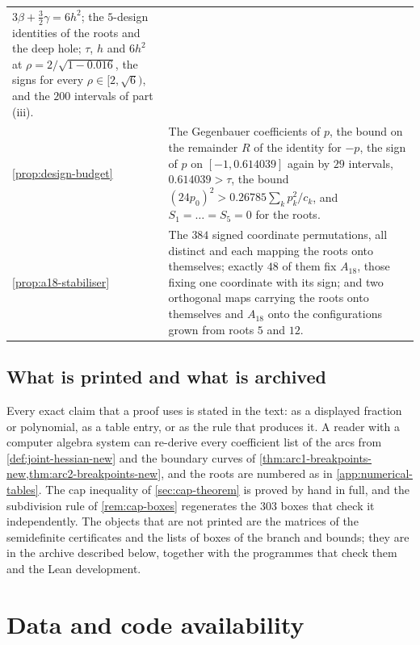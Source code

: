 \documentclass[11pt,reqno]{amsart}
\renewcommand{\_}{\origunderscore\allowbreak}
\numberwithin{equation}{section}
\theoremstyle{plain}
\theoremstyle{definition}
\theoremstyle{remark}
\begin{document}
\begin{longtable}{@{}p{}p{}@{}}
$3\beta+\frac32\gamma=6h^2$; the $5$-design identities of the roots and the
deep hole; $\tau$, $h$ and $6h^2$ at $\rho=2/\sqrt{1-0.016}$, the signs for
every $\rho\in[2,\sqrt6)$, and the $200$ intervals of part (iii). \\
\cref{prop:design-budget} & The Gegenbauer coefficients of $p$, the bound
on the remainder $R$ of the identity for $-p$, the sign of $p$ on
$[-1,0.614039]$ again by $29$ intervals, $0.614039>\tau$, the bound
$(24p_0)^2>0.26785\sum_kp_k^2/c_k$, and $S_1=\dots=S_5=0$ for the
roots. \\
\cref{prop:a18-stabiliser} & The $384$ signed coordinate permutations, all
distinct and each mapping the roots onto themselves; exactly $48$ of them
fix $A_{18}$, those fixing one coordinate with its sign; and two orthogonal
maps carrying the roots onto themselves and $A_{18}$ onto the
configurations grown from roots $5$ and $12$. \\
\end{longtable}

\subsection{What is printed and what is archived}

Every exact claim that a proof uses is stated in the text: as a displayed
fraction or polynomial, as a table entry, or as the rule that produces it. A reader with a computer algebra system can re-derive every
coefficient list of the arcs from \cref{def:joint-hessian-new} and the
boundary curves of \cref{thm:arc1-breakpoints-new,thm:arc2-breakpoints-new},
and the roots are numbered as in \cref{app:numerical-tables}.
The cap inequality of \cref{sec:cap-theorem} is proved by hand in full,
and the subdivision rule of \cref{rem:cap-boxes} regenerates the $303$
boxes that check it independently. The objects that are not printed are the
matrices of the semidefinite certificates and the lists of boxes of the
branch and bounds; they are in the archive described below, together with
the programmes that check them and the Lean development.

\section*{Data and code availability}
\end{document}
